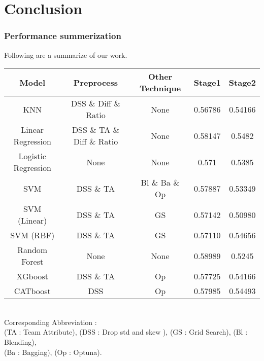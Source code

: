 \section{Conclusion}
\subsubsection*{Performance summerization}
Following are a summarize of our work.
\begin{table}[h]
    \centering
    \begin{tabular}{|c|c|c|c|c|}
    \hline
    Model & Preprocess & Other Technique & Stage1 & Stage2 \\ \hline\hline
    KNN   & DSS \& Diff \& Ratio   & None & 0.56786 & 0.54166  \\ \hline
    Linear Regression & DSS \& TA \& Diff \& Ratio & None & 0.58147 & 0.5482 \\ \hline
    Logistic Regression & None & None & 0.571 & 0.5385 \\ \hline
    SVM & DSS \& TA &  Bl \& Ba \& Op & 0.57887 & 0.53349 \\ \hline
    SVM (Linear) & DSS \& TA & GS & 0.57142 & 0.50980 \\ \hline
    SVM (RBF) & DSS \& TA & GS & 0.57110 & 0.54656 \\ \hline
    Random Forest & None & None & 0.58989 & 0.5245 \\ \hline
    XGboost & DSS \& TA & Op & 0.57725 & 0.54166 \\ \hline
    CATboost & DSS & Op & 0.57985 & 0.54493 \\ \hline
    \end{tabular}
    \label{tab:example_table}
\end{table}\\
Corresponding Abbreviation : \\
(TA : Team Attribute), (DSS : Drop std and skew ), (GS : Grid Search), (Bl : Blending),\\
 (Ba : Bagging), (Op : Optuna).

